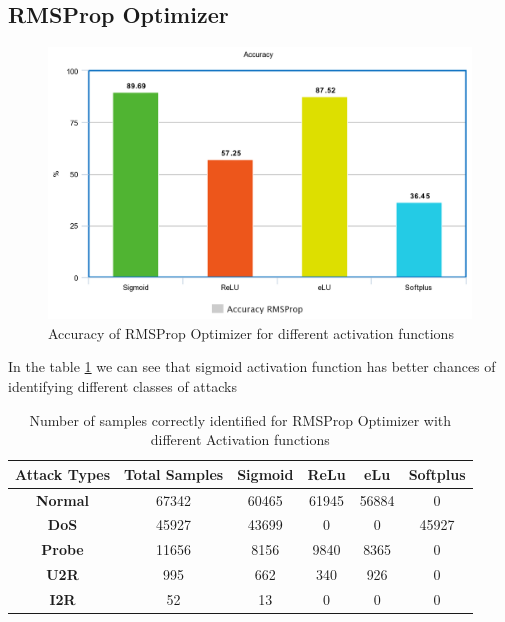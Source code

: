 \documentclass[12pt, a4paper]{report}
\begin{document}
\subsection {RMSProp Optimizer}
\begin{figure}[ht]
\centering
\captionsetup{justification=centering,margin=2cm}
\includegraphics[width=13cm]{accuracy_rmsprop_greedy.png}
\caption{ Accuracy of RMSProp Optimizer for different activation functions}
\label{fig:accuracy_rmsprop_greedy}
\end{figure}
In the table \ref{confusion_rmsprop} we can see that sigmoid activation function has better chances of identifying different classes of attacks
\begin{table}[ht]
\centering
\captionsetup{justification=centering,margin=2cm}
\begin{tabular}{|c|c|c|c|c|c|}
\hline
\textbf{Attack Types} & \textbf{Total Samples} & \textbf{Sigmoid} & \textbf{ReLu} & \textbf{eLu} & \textbf{Softplus} \\ \hline
\textbf{Normal}       & 67342                  & 60465                     & 61945         & 56884        & 0             \\ \hline
\textbf{DoS}          & 45927                  & 43699          		       & 0                  & 0         & 45927             \\ \hline
\textbf{Probe}        & 11656                  & 8156           		  & 9840         & 8365         & 0              \\ \hline
\textbf{U2R}          & 995                    & 662              		& 340           & 926          & 0               \\ \hline
\textbf{I2R}          & 52                     & 13               		& 0            & 0           & 0                \\ \hline
\end{tabular}
\caption{Number of samples correctly identified for RMSProp Optimizer with different Activation functions}
\label{confusion_rmsprop}
\end{table}
\clearpage
\end{document}
